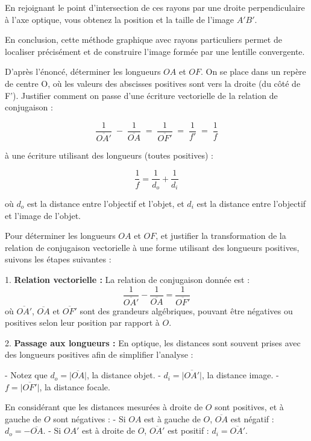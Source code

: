 \documentclass[answers]{exam}
\begin{document}
\begin{questions}
\begin{solution}
En rejoignant le point d'intersection de ces rayons par une droite perpendiculaire à l'axe optique, vous obtenez la position et la taille de l'image $A'B'$.

En conclusion, cette méthode graphique avec rayons particuliers permet de localiser précisément et de construire l'image formée par une lentille convergente.

\end{solution}

\question[1] D'après l'énoncé, déterminer les longueurs $OA$ et $OF$. On se place dans un repère de centre O, où les valeurs des abscisses positives sont vers la droite (du côté de F'). Justifier comment on passe d'une écriture vectorielle de la relation de conjugaison :

\[
  \frac{1}{\overline{OA'}} \;-\; \frac{1}{\overline{OA}}
  \;=\; \frac{1}{\overline{OF'}} 
  \;=\; \frac{1}{f'}
  \;=\; \frac{1}{f}
\]

à une écriture utilisant des longueurs (toutes positives) :

\[
  \frac{1}{f} = \frac{1}{d_o} + \frac{1}{d_i}
\]

où $d_o$ est la distance entre l'objectif et l'objet, et $d_i$ est la distance entre l'objectif et l'image de l'objet.



\begin{solution}
Pour déterminer les longueurs $OA$ et $OF$, et justifier la transformation de la relation de conjugaison vectorielle à une forme utilisant des longueurs positives, suivons les étapes suivantes :

1. \textbf{Relation vectorielle :} 
   La relation de conjugaison donnée est :
   \[
   \frac{1}{\overline{OA'}} - \frac{1}{\overline{OA}} = \frac{1}{\overline{OF'}}
   \]
   où $\overline{OA'}$, $\overline{OA}$ et $\overline{OF'}$ sont des grandeurs algébriques, pouvant être négatives ou positives selon leur position par rapport à $O$.

2. \textbf{Passage aux longueurs :} 
   En optique, les distances sont souvent prises avec des longueurs positives afin de simplifier l'analyse :

   - Notez que $d_o = \lvert \overline{OA} \rvert$, la distance objet.
   - $d_i = \lvert \overline{OA'} \rvert$, la distance image.
   - $f = \lvert \overline{OF'} \rvert$, la distance focale.

   En considérant que les distances mesurées à droite de $O$ sont positives, et à gauche de $O$ sont négatives :
   - Si $OA$ est à gauche de $O$, $\overline{OA}$ est négatif : $d_o = -\overline{OA}$.
   - Si $OA'$ est à droite de $O$, $\overline{OA'}$ est positif : $d_i = \overline{OA'}$.


\end{solution}
\end{questions}
\end{document}
